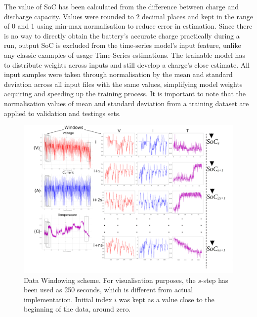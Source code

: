 
%
%
The value of SoC has been calculated from the difference between charge and discharge capacity.
Values were rounded to 2 decimal places and kept in the range of 0 and 1 using min-max normalisation to reduce error in estimation.
Since there is no way to directly obtain the battery's accurate charge practically during a run, output SoC is excluded from the time-series model's input feature, unlike any classic examples of usage Time-Series estimations.
The trainable model has to distribute weights across inputs and still develop a charge's close estimate.
All input samples were taken through normalisation by the mean and standard deviation across all input files with the same values, simplifying model weights acquiring and speeding up the training process.
It is important to note that the normalisation values of mean and standard deviation from a training dataset are applied to validation and testings sets.
\begin{landscape}
    \begin{figure}[ht]
        \centering
        \includegraphics[width=\linewidth]{II_Body/images/windowing3f-A3.jpg}
        \caption{Data Windowing scheme. For visualisation purposes, the $s$-step has been used as 250 seconds, which is different from actual implementation. Initial index $i$ was kept as a value close to the beginning of the data, around zero.}
        \label{fig:Windowing3f}
    \end{figure}
\end{landscape}


